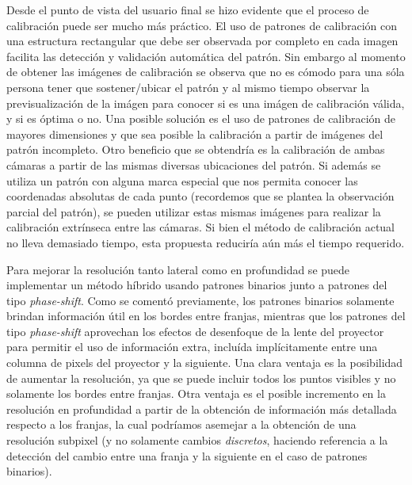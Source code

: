 Desde el punto de vista del usuario final se hizo evidente que el proceso de calibración puede ser mucho más práctico. El uso de patrones de calibración con una estructura rectangular que debe ser observada por completo en cada imagen facilita las detección y validación automática del patrón. Sin embargo al momento de obtener las imágenes de calibración se observa que no es cómodo para una sóla persona tener que sostener/ubicar el patrón y al mismo tiempo observar la previsualización de la imágen para conocer si es una imágen de calibración válida, y si es óptima o no. Una posible solución es el uso de patrones de calibración de mayores dimensiones y que sea posible la calibración a partir de imágenes del patrón incompleto. Otro beneficio que se obtendría es la calibración de ambas cámaras a partir de las mismas diversas ubicaciones del patrón. Si además se utiliza un patrón con alguna marca especial que nos permita conocer las coordenadas absolutas de cada punto (recordemos que se plantea la observación parcial del patrón), se pueden utilizar estas mismas imágenes para realizar la calibración extrínseca entre las cámaras. Si bien el método de calibración actual no lleva demasiado tiempo, esta propuesta reduciría aún más el tiempo requerido.

Para mejorar la resolución tanto lateral como en profundidad se puede implementar un método híbrido usando patrones binarios junto a patrones del tipo \emph{phase-shift}. Como se comentó previamente, los patrones binarios solamente brindan información útil en los bordes entre franjas, mientras que los patrones del tipo \emph{phase-shift} aprovechan los efectos de desenfoque de la lente del proyector para permitir el uso de información extra, incluída implícitamente entre una columna de pixels del proyector y la siguiente. Una clara ventaja es la posibilidad de aumentar la resolución, ya que se puede incluir todos los puntos visibles y no solamente los bordes entre franjas. Otra ventaja es el posible incremento en la resolución en profundidad a partir de la obtención de información más detallada respecto a los franjas, la cual podríamos asemejar a la obtención de una resolución subpixel (y no solamente cambios \emph{discretos}, haciendo referencia a la detección del cambio entre una franja y la siguiente en el caso de patrones binarios).






